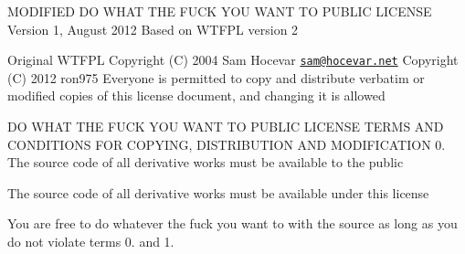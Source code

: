 M\-O\-D\-I\-F\-I\-E\-D D\-O W\-H\-A\-T T\-H\-E F\-U\-C\-K Y\-O\-U W\-A\-N\-T T\-O P\-U\-B\-L\-I\-C L\-I\-C\-E\-N\-S\-E Version 1, August 2012 Based on W\-T\-F\-P\-L version 2

Original W\-T\-F\-P\-L Copyright (C) 2004 Sam Hocevar \href{mailto:sam@hocevar.net}{\tt sam@hocevar.\-net} Copyright (C) 2012 ron975 Everyone is permitted to copy and distribute verbatim or modified copies of this license document, and changing it is allowed

D\-O W\-H\-A\-T T\-H\-E F\-U\-C\-K Y\-O\-U W\-A\-N\-T T\-O P\-U\-B\-L\-I\-C L\-I\-C\-E\-N\-S\-E T\-E\-R\-M\-S A\-N\-D C\-O\-N\-D\-I\-T\-I\-O\-N\-S F\-O\-R C\-O\-P\-Y\-I\-N\-G, D\-I\-S\-T\-R\-I\-B\-U\-T\-I\-O\-N A\-N\-D M\-O\-D\-I\-F\-I\-C\-A\-T\-I\-O\-N 0. The source code of all derivative works must be available to the public
\begin{DoxyEnumerate}
\item The source code of all derivative works must be available under this license
\item You are free to do whatever the fuck you want to with the source as long as you do not violate terms 0. and 1. 
\end{DoxyEnumerate}